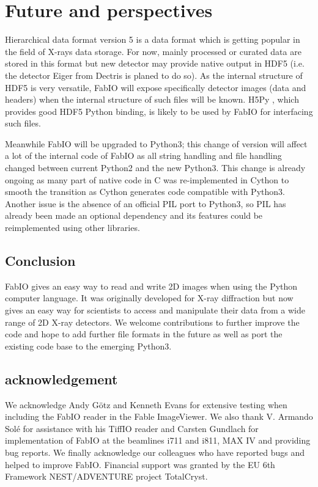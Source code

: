 \documentclass[preprint ]{iucr}
\begin{document}
\section{Future and perspectives}

Hierarchical data format version 5 \cite{hdf5} is a data format which is
getting popular in the field of X-rays data storage. For now, mainly processed
or curated data are stored in this format but new detector may provide native
output in HDF5 (i.e. the detector Eiger from Dectris is planed to do so). As the
internal structure of HDF5 is very versatile, FabIO will expose specifically
detector images (data and headers) when the internal structure of such files
will be known. H5Py \cite{h5py}, which provides good HDF5 Python binding, is likely to
be used by FabIO for interfacing such files. 

Meanwhile FabIO will be upgraded to Python3; this change of version will affect
a lot of the internal code of FabIO as all string handling and file handling
changed between current Python2 and the new Python3. This change is already
ongoing as many part of native code in C was re-implemented in
Cython \cite{cython} to smooth the transition as Cython generates code 
compatible with Python3. Another issue is the absence of an official PIL port to
Python3, so PIL has already been made an optional dependency and its features could be
reimplemented using other libraries. 

\subsection{Conclusion}

FabIO gives an easy way to read and write 2D images when using the
Python computer language.
It was originally developed for X-ray diffraction but now gives
an easy way for scientists to access and manipulate
their data from a wide range of 2D X-ray detectors.
We welcome contributions to further improve the code and hope to add
further file formats in the future as well as port the existing code base 
to the emerging Python3.


\subsection{acknowledgement}
We acknowledge Andy G\"otz and Kenneth Evans for extensive testing when including
the FabIO reader in the Fable ImageViewer.
We also thank V. Armando Sol\'e for assistance with his TiffIO reader and
Carsten Gundlach for implementation of FabIO at the beamlines i711 and i811, MAX IV and providing bug reports.
We finally acknowledge our colleagues who have reported bugs and helped to
improve FabIO.
Financial support was granted by the EU 6th Framework NEST/ADVENTURE project
TotalCryst.
\end{document}

